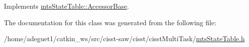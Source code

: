 Implements \hyperlink{classmts_state_table_1_1_accessor_base_afe801a46c5a1982b1d03e36d3dd0f16d}{mts\-State\-Table\-::\-Accessor\-Base}.



The documentation for this class was generated from the following file\-:\begin{DoxyCompactItemize}
\item 
/home/adeguet1/catkin\-\_\-ws/src/cisst-\/saw/cisst/cisst\-Multi\-Task/\hyperlink{mts_state_table_8h}{mts\-State\-Table.\-h}\end{DoxyCompactItemize}

